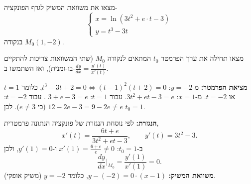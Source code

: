 
\begin{question}
מצאו את משוואת המשיק לגרף הפונקציה-
\[ \begin{cases} x=\ln\left(3t^2+e\cdot t-3\right)\\ y=t^3-3t\end{cases} \]
בנקודה $M_0(1,-2)$.
\end{question}

\begin{hint}
מצאו תחילה את ערך הפרמטר $t_0$ המתאים לנקודה $M_0$ (שתי המשוואות צריכות להתקיים בו-זמנית), ואז השתמשו ב-$\frac{dy}{dx}=\frac{y'(t)}{x'(t)}$.
\end{hint}

\begin{solution}
\textbf{מציאת הפרמטר:} מ-$y=-2$: $t^3-3t+2=0\iff(t-1)^2(t+2)=0$, כלומר $t=1$ או $t=-2$.
מ-$x=1$: $3t^2+et-3=e$. עבור $t=1$: $3+e-3=e$ \checkmark. עבור $t=-2$: $12-2e-3=9-2e\neq e$ (כי $e\neq3$). לכן $t_0=1$.

\textbf{הנגזרת:} לפי נוסחת הנגזרת של פונקציה הנתונה פרמטרית,
\[ x'(t)=\frac{6t+e}{3t^2+et-3},\qquad y'(t)=3t^2-3. \]
ב-$t_0=1$: $x'(1)=\frac{6+e}{e}\neq 0$ ו-$y'(1)=0$, ולכן
\[ \frac{dy}{dx}\Big|_{M_0}=\frac{y'(1)}{x'(1)}=0. \]
\textbf{משוואת המשיק:} $y-(-2)=0\cdot(x-1)$, כלומר $\boxed{y=-2}$ (משיק אופקי).
\end{solution}
